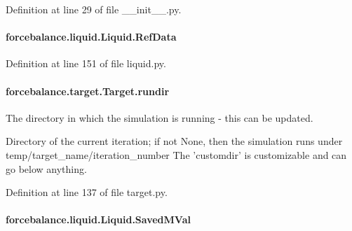 Definition at line 29 of file \-\_\-\-\_\-init\-\_\-\-\_\-.\-py.

\hypertarget{classforcebalance_1_1liquid_1_1Liquid_a472f32bbaf18b8ead19b9156f305b8fc}{
\paragraph[{Ref\-Data}]{\setlength{\rightskip}{0pt plus 5cm}forcebalance.\-liquid.\-Liquid.\-Ref\-Data\hspace{0.3cm}{\ttfamily [inherited]}}}\label{classforcebalance_1_1liquid_1_1Liquid_a472f32bbaf18b8ead19b9156f305b8fc}


Definition at line 151 of file liquid.\-py.

\hypertarget{classforcebalance_1_1target_1_1Target_a6872de5b2d4273b82336ea5b0da29c9e}{
\paragraph[{rundir}]{\setlength{\rightskip}{0pt plus 5cm}forcebalance.\-target.\-Target.\-rundir\hspace{0.3cm}{\ttfamily [inherited]}}}\label{classforcebalance_1_1target_1_1Target_a6872de5b2d4273b82336ea5b0da29c9e}


The directory in which the simulation is running -\/ this can be updated. 

Directory of the current iteration; if not None, then the simulation runs under temp/target\-\_\-name/iteration\-\_\-number The 'customdir' is customizable and can go below anything.

Definition at line 137 of file target.\-py.

\hypertarget{classforcebalance_1_1liquid_1_1Liquid_a5b9df1bf79a641156429e292f47b6afd}{
\paragraph[{Saved\-M\-Val}]{\setlength{\rightskip}{0pt plus 5cm}forcebalance.\-liquid.\-Liquid.\-Saved\-M\-Val\hspace{0.3cm}{\ttfamily [inherited]}}}\label{classforcebalance_1_1liquid_1_1Liquid_a5b9df1bf79a641156429e292f47b6afd}


